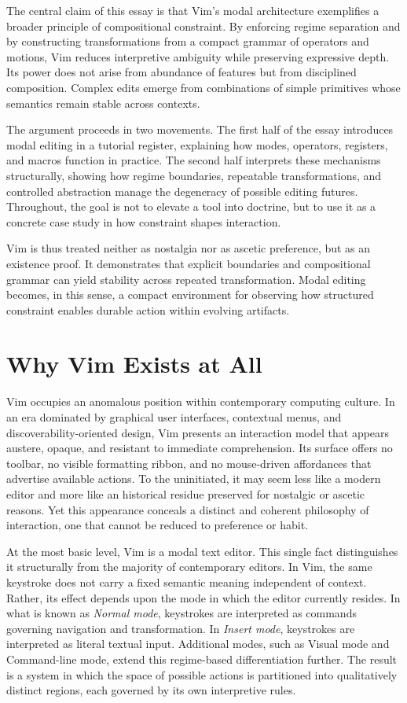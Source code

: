 \documentclass[12pt]{article}
\begin{document}
The central claim of this essay is that Vim’s modal architecture exemplifies a broader principle of compositional constraint. By enforcing regime separation and by constructing transformations from a compact grammar of operators and motions, Vim reduces interpretive ambiguity while preserving expressive depth. Its power does not arise from abundance of features but from disciplined composition. Complex edits emerge from combinations of simple primitives whose semantics remain stable across contexts.

The argument proceeds in two movements. The first half of the essay introduces modal editing in a tutorial register, explaining how modes, operators, registers, and macros function in practice. The second half interprets these mechanisms structurally, showing how regime boundaries, repeatable transformations, and controlled abstraction manage the degeneracy of possible editing futures. Throughout, the goal is not to elevate a tool into doctrine, but to use it as a concrete case study in how constraint shapes interaction.

Vim is thus treated neither as nostalgia nor as ascetic preference, but as an existence proof. It demonstrates that explicit boundaries and compositional grammar can yield stability across repeated transformation. Modal editing becomes, in this sense, a compact environment for observing how structured constraint enables durable action within evolving artifacts.

\section{Why Vim Exists at All}

Vim occupies an anomalous position within contemporary computing culture. In an era dominated by graphical user interfaces, contextual menus, and discoverability-oriented design, Vim presents an interaction model that appears austere, opaque, and resistant to immediate comprehension. Its surface offers no toolbar, no visible formatting ribbon, and no mouse-driven affordances that advertise available actions. To the uninitiated, it may seem less like a modern editor and more like an historical residue preserved for nostalgic or ascetic reasons. Yet this appearance conceals a distinct and coherent philosophy of interaction, one that cannot be reduced to preference or habit.

At the most basic level, Vim is a modal text editor. This single fact distinguishes it structurally from the majority of contemporary editors. In Vim, the same keystroke does not carry a fixed semantic meaning independent of context. Rather, its effect depends upon the mode in which the editor currently resides. In what is known as \emph{Normal mode}, keystrokes are interpreted as commands governing navigation and transformation. In \emph{Insert mode}, keystrokes are interpreted as literal textual input. Additional modes, such as Visual mode and Command-line mode, extend this regime-based differentiation further. The result is a system in which the space of possible actions is partitioned into qualitatively distinct regions, each governed by its own interpretive rules.
\end{document}
